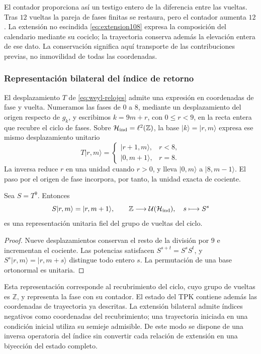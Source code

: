 El contador proporciona así un testigo entero de la diferencia entre las
vueltas. Tras \(12\) vueltas la pareja de fases finitas se restaura, pero
el contador aumenta \(12\). La extensión no escindida
\eqref{eq:extension108} expresa la composición del calendario mediante su
cociclo; la trayectoria conserva además la elevación entera de ese dato.
La conservación significa aquí transporte de las contribuciones previas,
no inmovilidad de todas las coordenadas.

\subsubsection{Representación bilateral del índice de retorno}

El desplazamiento \(T\) de \eqref{eq:weyl-relojes} admite una
expresión en coordenadas de fase y vuelta. Numeramos las fases de \(0\) a
\(8\), mediante un desplazamiento del origen respecto de \(g_k\), y
escribimos \(k=9m+r\), con \(0\leq r<9\), en la recta entera
que recubre el ciclo de fases. Sobre
\(\mathcal H_{\rm ind}=\ell^2(\mathbb Z)\), la base
\(|k\rangle=|r,m\rangle\) expresa ese mismo desplazamiento unitario
\[
 T|r,m\rangle=
 \begin{cases}
 |r+1,m\rangle,&r<8,\\
 |0,m+1\rangle,&r=8.
 \end{cases}
\]
La inversa reduce \(r\) en una unidad cuando \(r>0\), y lleva
\(|0,m\rangle\) a \(|8,m-1\rangle\). El paso por el origen de fase
incorpora, por tanto, la unidad exacta de cociente.

\begin{proposition}
\label{mono-ampl:representacion}
Sea \(S=T^9\). Entonces
\[
 S|r,m\rangle=|r,m+1\rangle,\qquad
 \mathbb Z\longrightarrow\mathcal U(\mathcal H_{\rm ind}),
 \quad s\longmapsto S^s
\]
es una representación unitaria fiel del grupo de vueltas del ciclo.
\end{proposition}
\begin{proof}
Nueve desplazamientos conservan el resto de la división por \(9\) e
incrementan el cociente. Las potencias satisfacen
\(S^{s+t}=S^sS^t\), y \(S^s|r,m\rangle=|r,m+s\rangle\) distingue
todo entero \(s\). La permutación de una base ortonormal es unitaria.
\end{proof}

Esta representación corresponde al recubrimiento del ciclo, cuyo grupo
de vueltas es \(\mathbb Z\), y representa la fase con su contador. El
estado del TPK contiene además las coordenadas de trayectoria ya descritas.
La extensión bilateral admite índices negativos como coordenadas del
recubrimiento; una trayectoria iniciada en una condición inicial utiliza
su semieje admisible. De este modo se dispone de una inversa operatoria
del índice sin convertir cada relación de extensión en una biyección del
estado completo.


